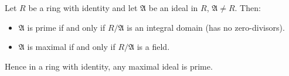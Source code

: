 Let $R$ be a ring with identity and let $\mathfrak{A}$ be an ideal in $R$, $\mathfrak{A} \neq R$. Then:
\begin{itemize}
\item $\mathfrak{A}$ is prime if and only if $R/\mathfrak{A}$ is an integral domain (has no zero-divisors).
\item $\mathfrak{A}$ is maximal if and only if $R/\mathfrak{A}$ is a field.
\end{itemize}
Hence in a ring with identity, any maximal ideal is prime.
